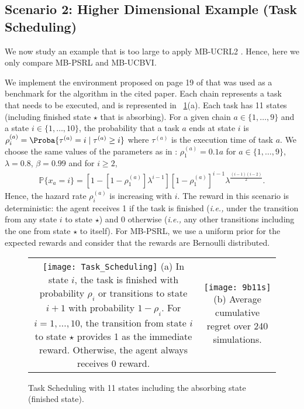 \begin{subappendices}
\subsection{Scenario 2: Higher Dimensional Example (Task Scheduling)}
\label{sssec:task_scheduling}

We now study an example that is too large to apply MB-UCRL2 . Hence, here we only compare MB-PSRL and MB-UCBVI. 

We implement the environment proposed on page 19 of \cite{duff1995q} that was used as a benchmark for the algorithm in the cited paper. Each chain represents a task that needs to be executed, and is represented in \figurename~\ref{fig:task_scheduling}(a). 
Each task has 11 states (including finished state $\star$ that is absorbing). 
For a given chain $a\in\{1,\dots,9\}$ and a state $i\in\{1,\dots,10\}$, the probability that a task $a$ ends at state $i$ is $\rho^{(a)}_{i}=\Proba{\tau^{(a)}=i \mid\tau^{(a)}\ge i}$ where $\tau^{(a)}$ is the execution time of task $a$. 
We choose the same values of the parameters as in \cite{duff1995q}: $\rho^{(a)}_{1}=0.1a$ for $a\in\{1,\dots,9\}$, $\lambda=0.8$, $\beta=0.99$ and for $i\ge2$, 
\begin{align*}
    \mathbb{P}\{x_a=i\}=\left[1-[1-\rho^{(a)}_{1}]\lambda^{i-1}\right][1-\rho^{(a)}_{1}]^{i-1}\lambda^{\frac{(i-1)(i-2)}{2}}.
\end{align*}
Hence, the hazard rate $\rho^{(a)}_{i}$ is increasing with $i$. The reward in this scenario is deterministic: the agent receives 1 if the task is finished (\emph{i.e.,} under the transition from any state $i$ to state $\star$) and 0 otherwise (\emph{i.e.,} any other transitions including the one from state $\star$ to itself).
For MB-PSRL, we use a uniform prior for the expected rewards and consider that the rewards are Bernoulli distributed.

\begin{figure}[ht]
    \center
    \begin{tabular}{cc}
        \begin{minipage}{.5\linewidth}
            \texttt{[image: Task\_Scheduling]}
            (a) In state $i$, the task is finished with probability $\rho_i$ or transitions to state $i+1$ with probability $1-\rho_i$. For $i=1,\dots,10$, the transition from state $i$ to state $\star$ provides 1 as the immediate reward. Otherwise, the agent always receives 0 reward.
        \end{minipage}
        &
        \begin{minipage}{.4\linewidth}
            \texttt{[image: 9b11s]}
            (b) Average cumulative regret over 240 simulations.
        \end{minipage}        
    \end{tabular}
    \caption{Task Scheduling with 11 states including the absorbing state (finished state). }
    \label{fig:task_scheduling}
\end{figure}



\end{subappendices}
